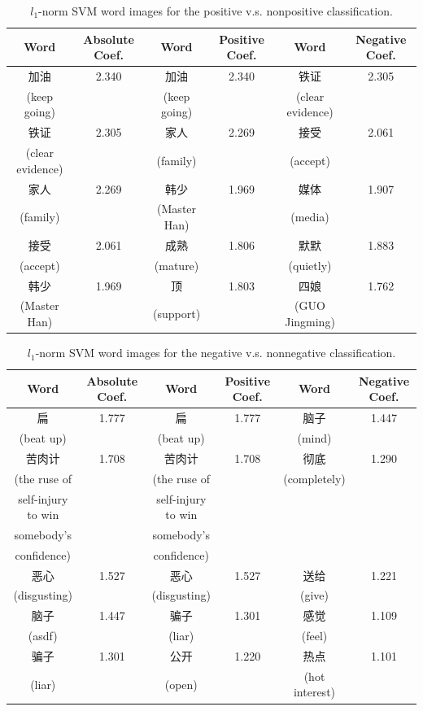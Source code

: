 \documentclass[11pt]{article}
\newcommand{\1}[1]{{\mathbf 1}\left\{#1\right\}}        %
\begin{document}
\begin{table}[!h]
\caption{$l_1$-norm SVM word images for the positive v.s. nonpositive classification.}
\begin{center}
\begin{tabular}{|c|c||c|c||c|c|}
\hline
Word & Absolute Coef. & Word & Positive Coef. & Word & Negative Coef.\\ \hline \hline
加油 & 2.340 & 加油 & 2.340 & 铁证 & 2.305\\
(keep going) & & (keep going) & & (clear evidence) & \\\hline
铁证 & 2.305 & 家人 & 2.269 & 接受 & 2.061\\
(clear evidence) & & (family) & & (accept) & \\\hline
家人 & 2.269 & 韩少 & 1.969 & 媒体 & 1.907\\
(family) & & (Master Han) & & (media) & \\\hline
接受 & 2.061 & 成熟 & 1.806 & 默默 & 1.883\\
(accept) & & (mature) & & (quietly) & \\\hline
韩少 & 1.969 & 顶 & 1.803 & 四娘 & 1.762\\
(Master Han) & & (support) & & (GUO Jingming) & \\\hline
\end{tabular}
\label{tb:svmpos}
\end{center}
\end{table}



\begin{table}
\caption{$l_1$-norm SVM word images for the negative v.s. nonnegative classification.}
\begin{center}
\begin{tabular}{|c|c||c|c||c|c|}
\hline
Word & Absolute Coef. & Word & Positive Coef. & Word & Negative Coef.\\ \hline  \hline
扁 & 1.777 & 扁 & 1.777 & 脑子 & 1.447\\
(beat up) & & (beat up) & & (mind) & \\\hline
苦肉计 & 1.708 & 苦肉计 & 1.708 & 彻底 & 1.290\\
(the ruse of  & & (the ruse of  &  &  (completely) &  \\
self-injury to win & &  self-injury to win &  & &  \\
somebody's & & somebody's  &  & &  \\
 confidence) & &  confidence)  &  & &  \\\hline
恶心 & 1.527 & 恶心 & 1.527 & 送给 & 1.221\\
(disgusting) & & (disgusting) & & (give) & \\\hline
脑子 & 1.447 & 骗子 & 1.301 & 感觉 & 1.109\\
(asdf) & & (liar) & & (feel) & \\\hline
骗子 & 1.301 & 公开 & 1.220 & 热点 & 1.101\\
(liar) & & (open) & & (hot interest) & \\\hline
\end{tabular}
\label{tb:svmneg}
\end{center}
\end{table}
\end{document}
